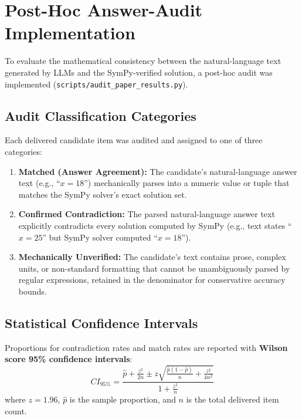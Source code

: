 \documentclass[11pt,letterpaper]{article}
\begin{document}
\section{Post-Hoc Answer-Audit Implementation}\label{sec:answer-audit}

To evaluate the mathematical consistency between the natural-language text generated by LLMs and the SymPy-verified solution, a post-hoc audit was implemented (\texttt{scripts/audit\_paper\_results.py}).

\subsection{Audit Classification Categories}
Each delivered candidate item was audited and assigned to one of three categories:
\begin{enumerate}
    \item \textbf{Matched (Answer Agreement):} The candidate's natural-language answer text (e.g., ``$x = 18$'') mechanically parses into a numeric value or tuple that matches the SymPy solver's exact solution set.
    \item \textbf{Confirmed Contradiction:} The parsed natural-language answer text explicitly contradicts every solution computed by SymPy (e.g., text states ``$x = 25$'' but SymPy solver computed ``$x = 18$'').
    \item \textbf{Mechanically Unverified:} The candidate's text contains prose, complex units, or non-standard formatting that cannot be unambiguously parsed by regular expressions, retained in the denominator for conservative accuracy bounds.
\end{enumerate}

\subsection{Statistical Confidence Intervals}
Proportions for contradiction rates and match rates are reported with \textbf{Wilson score 95\% confidence intervals}:
\begin{equation}
    CI_{95\%} = \frac{\hat{p} + \frac{z^2}{2n} \pm z \sqrt{\frac{\hat{p}(1-\hat{p})}{n} + \frac{z^2}{4n^2}}}{1 + \frac{z^2}{n}}
\end{equation}
where $z = 1.96$, $\hat{p}$ is the sample proportion, and $n$ is the total delivered item count.
\end{document}
